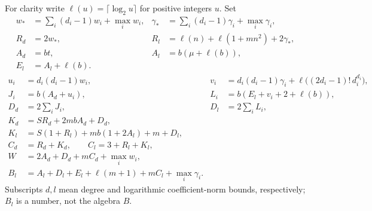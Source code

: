 \documentclass[11pt,a4paper]{article}
\begin{document}
For clarity write $\ell(u)=\lceil\log_2u\rceil$ for positive
integers $u$. Set
\begin{align*}
 w_*&=\sum_i(d_i-1)w_i+\max_i w_i,&
 \gamma_*&=\sum_i(d_i-1)\gamma_i+\max_i\gamma_i,\\
 R_d&=2w_*,&
 R_l&=\ell(n)+\ell(1+mn^2)+2\gamma_*,\\
 A_d&=bt,& A_l&=b(\mu+\ell(b)),\\
 E_l&=A_l+\ell(b).&&
\end{align*}
\begin{align*}
 u_i&=d_i(d_i-1)w_i,&
 v_i&=d_i(d_i-1)\gamma_i+
             \ell\bigl((2d_i-1)!\,d_i^{d_i}\bigr),\\
 J_i&=b(A_d+u_i),&
 L_i&=b(E_l+v_i+2+\ell(b)),\\
 D_d&=2\sum_iJ_i,&D_l&=2\sum_iL_i,\\
 K_d&=SR_d+2mbA_d+D_d,\\
 K_l&=S(1+R_l)+mb(1+2A_l)+m+D_l,\\
 C_d&=R_d+K_d,\qquad C_l=3+R_l+K_l,\\
 W&=2A_d+D_d+mC_d+\max_i w_i,\\
 B_l&=A_l+D_l+E_l+\ell(m+1)+mC_l+\max_i\gamma_i.
\end{align*}
Subscripts $d,l$ mean degree and logarithmic coefficient-norm
bounds, respectively; $B_l$ is a number, not the algebra $B$.
\end{document}
